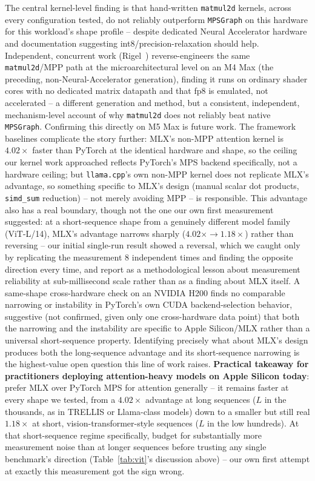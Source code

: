 \documentclass{article}
\newcommand{\code}[1]{\texttt{#1}}
\begin{document}
The central kernel-level finding is that hand-written \code{matmul2d} kernels, across every
configuration tested, do not reliably outperform \code{MPSGraph} on this hardware for this
workload's shape profile -- despite dedicated Neural Accelerator hardware and documentation
suggesting int8/precision-relaxation should help. Independent, concurrent work
(Rigel~\cite{rigel}) reverse-engineers the same \code{matmul2d}/MPP path at the microarchitectural
level on an M4 Max (the preceding, non-Neural-Accelerator generation), finding it runs on ordinary
shader cores with no dedicated matrix datapath and that fp8 is emulated, not accelerated -- a
different generation and method, but a consistent, independent, mechanism-level account of why
\code{matmul2d} does not reliably beat native \code{MPSGraph}. Confirming this directly on M5 Max
is future work. The framework baselines complicate the story further: MLX's non-MPP attention
kernel is $4.02\times$ faster than PyTorch at the identical hardware and shape, so the ceiling our
kernel work approached reflects PyTorch's MPS backend specifically, not a hardware ceiling; but
\code{llama.cpp}'s own non-MPP kernel does not replicate MLX's advantage, so something specific to
MLX's design (manual scalar dot products, \code{simd\_sum} reduction) -- not merely avoiding MPP --
is responsible. This advantage also has a real boundary, though not the one our own first
measurement suggested: at a short-sequence shape from a genuinely different model family
(ViT-L/14), MLX's advantage narrows sharply ($4.02\times \to 1.18\times$) rather than reversing --
our initial single-run result showed a reversal, which we caught only by replicating the
measurement 8 independent times and finding the opposite direction every time, and report as a
methodological lesson about measurement reliability at sub-millisecond scale rather than as a
finding about MLX itself. A same-shape cross-hardware check on an NVIDIA H200 finds no comparable
narrowing or instability in PyTorch's own CUDA backend-selection behavior, suggestive (not
confirmed, given only one cross-hardware data point) that both the narrowing and the instability
are specific to Apple Silicon/MLX rather than a universal short-sequence property. Identifying
precisely what about MLX's design produces both the long-sequence advantage and its short-sequence
narrowing is the highest-value open question this line of work raises.
\textbf{Practical takeaway for practitioners deploying attention-heavy models on Apple Silicon
today}: prefer MLX over PyTorch MPS for attention generally -- it remains faster at every shape we
tested, from a $4.02\times$ advantage at long sequences ($L$ in the thousands, as in TRELLIS or
Llama-class models) down to a smaller but still real $1.18\times$ at short, vision-transformer-style
sequences ($L$ in the low hundreds). At that short-sequence regime specifically, budget for
substantially more measurement noise than at longer sequences before trusting any single
benchmark's direction (Table~\ref{tab:vit}'s discussion above) -- our own first attempt at exactly
this measurement got the sign wrong.
\end{document}
